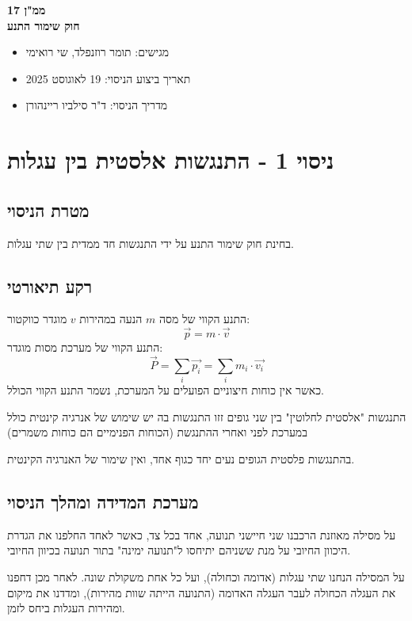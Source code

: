 \documentclass[14pt]{extarticle}
\begin{document}
\begin{center}
    {\LARGE \textbf{ממ"ן 17}}\\
    {\textbf{חוק שימור התנע}}
\end{center}

\begin{itemize}
    \item מגישים: תומר רוזנפלד, שי רואימי
    \item תאריך ביצוע הניסוי: 19 לאוגוסט 2025
    \item מדריך הניסוי: ד"ר סילביו ריינהורן
\end{itemize}
\newpage
\section*{ניסוי 1 - התנגשות אלסטית בין עגלות}
\subsection*{מטרת הניסוי}
בחינת חוק שימור התנע על ידי התנגשות חד ממדית בין שתי עגלות.
\subsection*{רקע תיאורטי}
התנע הקווי של מסה $m$ הנעה במהירות $v$ מוגדר כווקטור:
\begin{equation}
    \vec{p} = m \cdot \vec{v}
\end{equation}
התנע הקווי של מערכת מסות  מוגדר:
\begin{equation}
    \vec{P} = \sum_{i} \vec{p_i} = \sum_{i} m_i \cdot \vec{v_i}
\end{equation}
כאשר אין כוחות חיצוניים  הפועלים  על המערכת, נשמר התנע הקווי הכולל.

התנגשות "אלסטית לחלוטין" בין שני גופים זזו התנגשות בה יש שימוש של אנרגיה קינטית כולל במערכת לפני ואחרי ההתנגשת (הכוחות הפנימיים הם כוחות משמרים)

בהתנגשות פלסטית  הגופים נעים יחד כגוף אחד, ואין שימור  של האנרגיה הקינטית.

\subsection*{מערכת המדידה ומהלך הניסוי}
על מסילה מאוזנת הרכבנו שני חיישני תנועה, אחד בכל צד, כאשר לאחד החלפנו את הגדרת היכוון החיובי על מנת ששניהם יתיחסו ל"תנועה ימינה" בתור תנועה בכיוון החיובי.

על המסילה הנחנו  שתי עגלות (אדומה וכחולה), ועל כל אחת משקולת שונה.
לאחר מכן דחפנו את העגלה הכחולה לעבר העגלה האדומה (התנועה הייתה שוות מהירות), ומדדנו את מיקום ומהירות העגלות ביחס לזמן.
\end{document}
